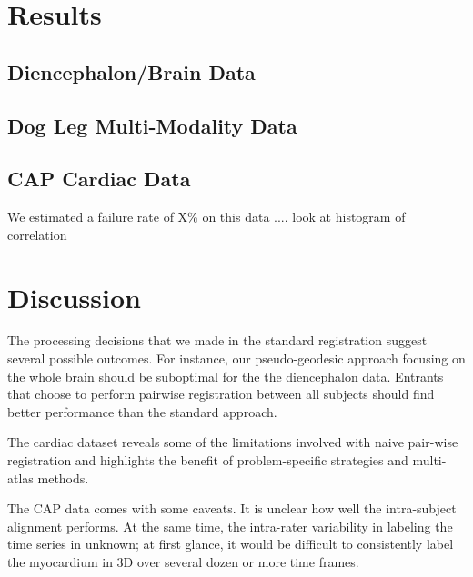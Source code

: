 \documentclass{llncs}
\begin{document}
\section{Results}

\subsection{Diencephalon/Brain Data}

\subsection{Dog Leg Multi-Modality Data}

\subsection{CAP Cardiac Data}
We estimated a failure rate of X\% on this data  .... look at
histogram of correlation 

\section{Discussion} The processing decisions that we made in the
standard registration suggest several possible outcomes.  For
instance, our pseudo-geodesic approach focusing on the whole brain
should be suboptimal for the the diencephalon data. Entrants that
choose to perform pairwise registration between all subjects should
find better performance than the standard approach.

The cardiac dataset reveals some of the limitations involved with naive
pair-wise registration and highlights the benefit of
problem-specific strategies and multi-atlas methods.  

The CAP data comes with some caveats.  It is unclear how well the
intra-subject alignment performs.  At the same time, the intra-rater
variability in labeling the time series in unknown; at first glance,
it would be difficult to consistently label the myocardium in 3D over
several dozen or more time frames. 



\end{document}
